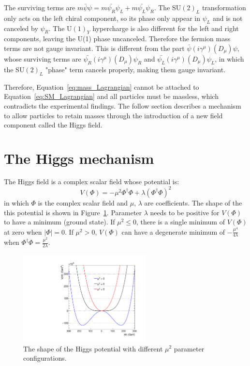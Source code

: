 The surviving terms are $m\bar{\psi} \psi = m\bar{\psi_{R}}\psi_{L} + m\bar{\psi_{L}}\psi_{R}$.
The SU$(2)_{L}$ transformation only acts on the left chiral component,
so its phase only appear in $\psi_{L}$ and is not canceled by $\psi_{R}$.
The U$(1)_{Y}$ hypercharge is also different for the left and right components,
leaving the U(1) phase uncanceled.
Therefore the fermion mass terms are not gauge invariant.
This is different from the part $\bar{\psi} (i\gamma^{\mu})(D_{\mu})\psi$,
whose surviving terms are $\bar{\psi_{R}} (i\gamma^{\mu})(D_{\mu})\psi_{R}$ and $\bar{\psi_{L}} (i\gamma^{\mu})(D_{\mu})\psi_{L}$, 
in which the SU$(2)_{L}$ "phase" term cancels properly, making them gauge invariant.

Therefore, Equation~\ref{eq:mass_Lagrangian} cannot be attached to Equation~\ref{eq:SM_Lagrangian} and all particles must be massless,
which contradicts the experimental findings.
The follow section describes a mechanism to allow particles to retain masses 
through the introduction of a new field component called the Higgs field.


\section{The Higgs mechanism}\label{sec:Higgs_mech}

The Higgs field is a complex scalar field whose potential is:
\begin{equation} \label{eq:Higgs_potential}
    V(\Phi) = - \mu^{2} \Phi^{\dagger}\Phi + \lambda(\Phi^{\dagger}\Phi)^{2}
\end{equation}
in which $\Phi$ is the complex scalar field and $\mu$, $\lambda$ are coefficients.
The shape of the this potential is shown in Figure~\ref{fig:Higgs_potential}. 
Parameter $\lambda$ needs to be positive for $V(\Phi)$ to have a minimum (ground state).
If $\mu^{2} \leqslant 0$, there is a single minimum of $V(\Phi)$ at zero when $|\Phi| = 0$.
If $\mu^{2} > 0$, $V(\Phi)$ can have a degenerate minimum of $-\frac{\mu^{4}}{4\lambda}$ when $\Phi^{\dagger}\Phi = \frac{\mu^{2}}{2\lambda}$.

\begin{figure}[!htb]
  \centering
  \captionsetup{justification=justified}
  \includegraphics[width=0.6\textwidth]{pics/Intro/Higgs_field.pdf}
  \caption{The shape of the Higgs potential with different $\mu^{2}$ parameter configurations.}
  \label{fig:Higgs_potential}
\end{figure}

